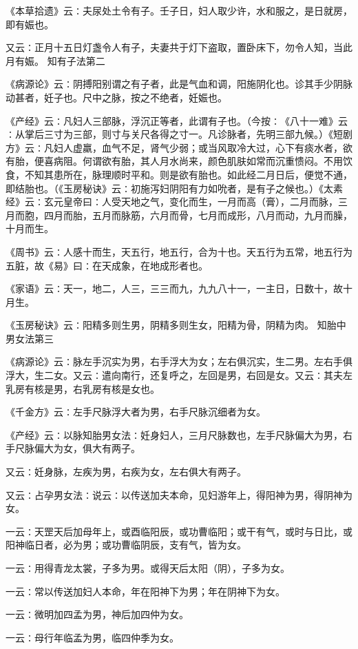 \documentclass[a4paper,12pt,UTF8,twoside]{ctexbook}
\begin{document}
《本草拾遗》云∶夫尿处土令有子。壬子日，妇人取少许，水和服之，是日就房，即有娠也。

又云∶正月十五日灯盏令人有子，夫妻共于灯下盗取，置卧床下，勿令人知，当此月有娠。
知有子法第二

《病源论》云∶阴搏阳别谓之有子者，此是气血和调，阳施阴化也。诊其手少阴脉动甚者，妊子也。尺中之脉，按之不绝者，妊娠也。

《产经》云∶凡妇人三部脉，浮沉正等者，此谓有子也。（今按∶《八十一难》云∶从掌后三寸为三部，则寸与关尺各得之寸一。凡诊脉者，先明三部九候。）《短剧方》云∶凡妇人虚羸，血气不足，肾气少弱；或当风取冷大过，心下有痰水者，欲有胎，便喜病阻。何谓欲有胎，其人月水尚来，颜色肌肤如常而沉重愦闷。不用饮食，不知其患所在，脉理顺时平和。则是欲有胎也。如此经二月日后，便觉不通，即结胎也。（《玉房秘诀》云∶初施泻妇阴阳有力如吮者，是有子之候也。）《太素经》云∶玄元皇帝曰∶人受天地之气，变化而生，一月而高（膏），二月而脉，三月而胞，四月而胎，五月而脉筋，六月而骨，七月而成形，八月而动，九月而臊，十月而生。

《周书》云∶人感十而生，天五行，地五行，合为十也。天五行为五常，地五行为五脏，故《易》曰∶在天成象，在地成形者也。

《家语》云∶天一，地二，人三，三三而九，九九八十一，一主日，日数十，故十月生。

《玉房秘诀》云∶阳精多则生男，阴精多则生女，阳精为骨，阴精为肉。
知胎中男女法第三

《病源论》云∶脉左手沉实为男，右手浮大为女；左右俱沉实，生二男。左右手俱浮大，生二女。又云∶遣向南行，还复呼之，左回是男，右回是女。又云∶其夫左乳房有核是男，右乳房有核是女也。

《千金方》云∶左手尺脉浮大者为男，右手尺脉沉细者为女。

《产经》云∶以脉知胎男女法∶妊身妇人，三月尺脉数也，左手尺脉偏大为男，右手尺脉偏大为女，俱大有两子。

又云∶妊身脉，左疾为男，右疾为女，左右俱大有两子。

又云∶占孕男女法∶说云∶以传送加夫本命，见妇游年上，得阳神为男，得阴神为女。

一云∶天罡天后加母年上，或酉临阳辰，或功曹临阳；或干有气，或时与日比，或阳神临日者，必为男；或功曹临阴辰，支有气，皆为女。

一云∶用得青龙太裳，子多为男。或得天后太阳（阴），子多为女。

一云∶常以传送加妇人本命，年在阳神下为男；年在阴神下为女。

一云∶微明加四孟为男，神后加四仲为女。

一云∶母行年临孟为男，临四仲季为女。
\end{document}
